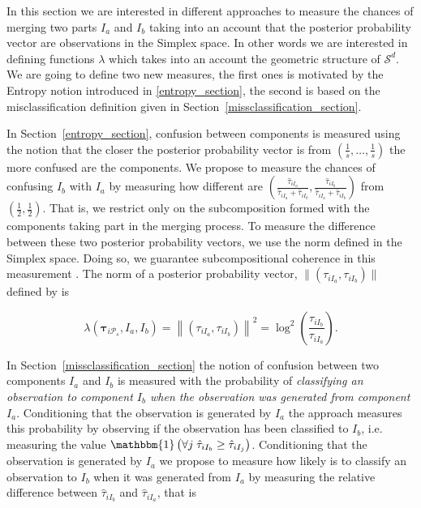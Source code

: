 \documentclass[10pt, a4paper]{article}
\newcommand{\m}[1]{\boldsymbol{#1}}
\begin{document}
\begin{spacing}{1.9}
In this section we are interested in different approaches to measure the chances of merging two parts $I_a$ and $I_b$ taking into an account that the posterior probability vector are observations in the Simplex space. In other words we are interested in defining functions $\lambda$ which takes into an account the geometric structure of $\mathcal{S}^d$. We are going to define two new measures, the first ones is motivated by the Entropy notion introduced in \ref{entropy_section}, the second is based on the misclassification definition given in Section~\ref{missclassification_section}.


In Section~\ref{entropy_section}, confusion between components is measured using the notion that the closer the posterior probability vector is from $(\frac{1}{s}, \dots, \frac{1}{s})$ the more confused are the components. We propose to measure the chances of confusing $I_b$ with $I_a$  by measuring how different are $(\frac{\hat{\tau}_{i I_a}}{\hat{\tau}_{i I_a} + \hat{\tau}_{i I_b}}, \frac{\hat{\tau}_{i I_b}}{\hat{\tau}_{i I_a} + \hat{\tau}_{i I_b}})$ from $(\frac{1}{2}, \frac{1}{2})$. That is, we restrict only on the subcomposition formed with the components taking part in the merging process. To measure the difference between these two posterior probability vectors, we use the norm defined in the Simplex space. Doing so, we guarantee subcompositional coherence in this measurement \citep{aitchison1986statistical}. The norm of a posterior probability vector, $\| (\tau_{iI_a}, \tau_{iI_b}) \|$  defined by \cite{aitchison2002simplicial} is 

\[
\lambda(\m\tau_{i \mathcal{P}_s},  I_a,  I_b) = \left\| (\tau_{iI_a}, \tau_{iI_b}) \right\|^2 = \log^2 \left(\frac{ \tau_{iI_b} }{ \tau_{iI_a} }\right).
\]


In Section~\ref{missclassification_section} the notion of confusion between two components $I_a$ and $I_b$ is measured with the probability of \emph{classifying an observation to component $I_b$ when the observation was generated from component $I_a$}. Conditioning that the observation is generated by $I_a$  the approach measures this probability by observing if the observation has been classified to $I_b$, i.e.  measuring the value $\mathbbm{1}\left( \forall j\; \hat{\tau}_{i I_{b}} \geq \hat{\tau}_{i I_j} \right)$. Conditioning that the observation is generated by $I_a$ we propose to measure how likely is to classify an observation to $I_b$ when it was generated from $I_a$ by measuring the relative difference between $\hat{\tau}_{i I_b}$ and $\hat{\tau}_{i I_a}$, that is 


\end{spacing}
\end{document}
